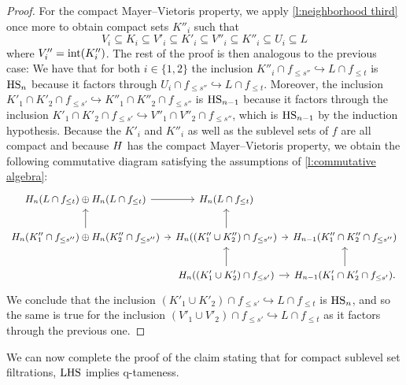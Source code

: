 \begin{proof}
	For the compact Mayer--Vietoris property, we apply \cref{l:neighborhood third} once more to obtain compact sets $K''_i$ such that
	\begin{equation*}
	V_i \subseteq K_i \subseteq V'_i \subseteq K'_i \subseteq V''_i \subseteq K''_i \subseteq U_i \subseteq L
	\end{equation*}
	where $V''_i = \operatorname{int}(K''_i)$.
	The rest of the proof is then analogous to the previous case:
	We have that for both $i \in \{1, 2\}$ the inclusion
	$K''_i \cap f_{\leq s''} \hookrightarrow L \cap f_{\leq t}$
	is $\mathrm{HS}_n$ because it factors through $U_i \cap f_{\leq s''} \hookrightarrow L \cap f_{\leq t}$.
	Moreover, the inclusion
	$K'_1 \cap K'_2 \cap f_{\leq s'} \hookrightarrow K''_1 \cap K''_2 \cap f_{\leq s''}$
	is $\mathrm{HS}_{n-1}$ because it factors through the inclusion
	$K'_1 \cap K'_2 \cap f_{\leq s'} \hookrightarrow V''_1 \cap V''_2 \cap f_{\leq s''}$,
	which is $\mathrm{HS}_{n-1}$ by the induction hypothesis.
	Because the $K'_i$ and $K''_i$ as well as the sublevel sets of $f$ are all compact and because $H$ has the compact Mayer--Vietoris property, we obtain the following commutative diagram satisfying the assumptions of \cref{l:commutative algebra}:
	\[
	\begin{tikzcd}[column sep=tiny,every matrix/.append style={nodes={font=\small}}]
	\H_n(L \cap f_{\leq t}) \oplus \H_n(L \cap f_{\leq t}) \arrow[r] &
	\H_n(L \cap f_{\leq t}) & \\
	\H_{n}(K''_1 \cap f_{\leq s''}) \oplus \H_n(K''_2 \cap f_{\leq s''}) \arrow[r] \arrow[u] &
	\H_{n}((K''_1 \cup K''_2) \cap f_{\leq s''}) \arrow[r] \arrow[u] &
	\H_{n-1}(K''_1 \cap K''_2 \cap f_{\leq s''}) \\ &
	\H_{n}((K'_1 \cup K'_2) \cap f_{\leq s'}) \arrow[r] \arrow[u] &
	\H_{n-1}(K'_1 \cap K'_2 \cap f_{\leq s'}) \arrow[u].
	\end{tikzcd}
	\]
	We conclude that the inclusion
	$\left(K'_1 \cup K'_2 \right) \cap f_{\leq s'} \hookrightarrow L \cap f_{\leq t}$
	is $\mathrm{HS}_n$, and so the same is true for the inclusion
	$\left(V'_1 \cup V'_2 \right) \cap f_{\leq s'} \hookrightarrow L \cap f_{\leq t}$
	as it factors through the previous one.
\end{proof}

We can now complete the proof of the claim stating that for compact sublevel set filtrations, $\mathrm{LHS}$ implies q-tameness.

